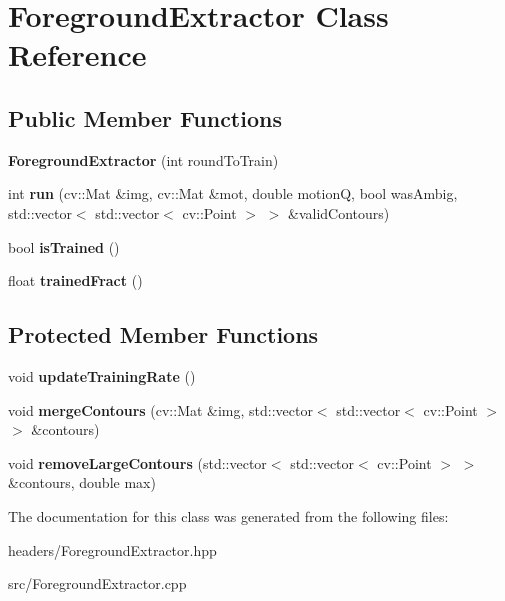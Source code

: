 \hypertarget{classForegroundExtractor}{\section{Foreground\-Extractor Class Reference}
\label{classForegroundExtractor}
}
\subsection*{Public Member Functions}
\begin{DoxyCompactItemize}
\item 
\hypertarget{classForegroundExtractor_a8ce9cd0c7aed353cc9e52175c1179256}{{\bfseries Foreground\-Extractor} (int round\-To\-Train)}\label{classForegroundExtractor_a8ce9cd0c7aed353cc9e52175c1179256}

\item 
\hypertarget{classForegroundExtractor_ad6e362a0ee050f99dc565d3a1683f9db}{int {\bfseries run} (cv\-::\-Mat \&img, cv\-::\-Mat \&mot, double motion\-Q, bool was\-Ambig, std\-::vector$<$ std\-::vector$<$ cv\-::\-Point $>$ $>$ \&valid\-Contours)}\label{classForegroundExtractor_ad6e362a0ee050f99dc565d3a1683f9db}

\item 
\hypertarget{classForegroundExtractor_ad70860dab3af9c6519974da0e1974c44}{bool {\bfseries is\-Trained} ()}\label{classForegroundExtractor_ad70860dab3af9c6519974da0e1974c44}

\item 
\hypertarget{classForegroundExtractor_a8f75097646a2804a07726aa1cb5b2596}{float {\bfseries trained\-Fract} ()}\label{classForegroundExtractor_a8f75097646a2804a07726aa1cb5b2596}

\end{DoxyCompactItemize}
\subsection*{Protected Member Functions}
\begin{DoxyCompactItemize}
\item 
\hypertarget{classForegroundExtractor_a176a1ac5cb57e525d59b761b68d1d4e4}{void {\bfseries update\-Training\-Rate} ()}\label{classForegroundExtractor_a176a1ac5cb57e525d59b761b68d1d4e4}

\item 
\hypertarget{classForegroundExtractor_a4ed8865b9e063b29f7e687e37193588d}{void {\bfseries merge\-Contours} (cv\-::\-Mat \&img, std\-::vector$<$ std\-::vector$<$ cv\-::\-Point $>$ $>$ \&contours)}\label{classForegroundExtractor_a4ed8865b9e063b29f7e687e37193588d}

\item 
\hypertarget{classForegroundExtractor_a1e6a870b80ad619cd8fb77cd1c3441da}{void {\bfseries remove\-Large\-Contours} (std\-::vector$<$ std\-::vector$<$ cv\-::\-Point $>$ $>$ \&contours, double max)}\label{classForegroundExtractor_a1e6a870b80ad619cd8fb77cd1c3441da}

\end{DoxyCompactItemize}


The documentation for this class was generated from the following files\-:\begin{DoxyCompactItemize}
\item 
headers/Foreground\-Extractor.\-hpp\item 
src/Foreground\-Extractor.\-cpp\end{DoxyCompactItemize}
